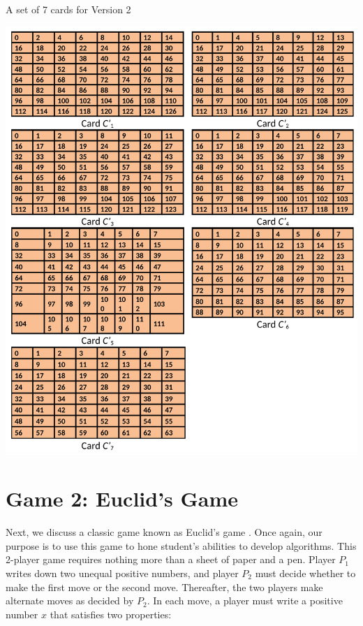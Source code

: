 \begin{multicols}{2}
\begin{table}[H]
\centering
\caption{A set of 7 cards for Version 2}\label{chapter-3-table-3}
\includegraphics[scale=.62]{src/Figures/chap3/table3.jpg}

\vspace{-.3cm}

\end{table}

\vspace{-.3cm}

\section{Game 2: Euclid's Game}\label{section-4} 

\vspace{-.2cm}

Next, we discuss a classic game known as Euclid’s game \cite{art3-key02}\cite{art3-key03}. Once again, our purpose is to use this game to hone student's abilities to develop algorithms. This 2-player game requires nothing more than a sheet of paper and a pen. Player $P_{1}$ writes down two unequal positive numbers, and player $P_{2}$ must decide whether to make the first move or the second move. Thereafter, the two players make alternate moves as decided by $P_{2}$. In each move, a player must write a positive number $x$ that satisfies two properties:
\begin{itemize}


\end{itemize}
\end{multicols}
